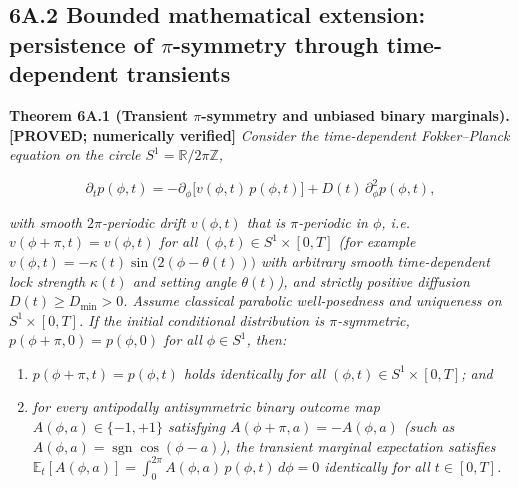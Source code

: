 \documentclass[
  american,
  11pt,
  letterpaper,
]{article}
\providecommand{\tightlist}{%
  \setlength{\itemsep}{0pt}\setlength{\parskip}{0pt}}
\begin{document}
\subsection{\texorpdfstring{6A.2 Bounded mathematical extension: persistence of \(\pi\)-symmetry through time-dependent transients}{6A.2 Bounded mathematical extension: persistence of \textbackslash pi-symmetry through time-dependent transients}}\label{a.2-bounded-mathematical-extension-persistence-of-pi-symmetry-through-time-dependent-transients}

\textbf{Theorem 6A.1 (Transient \(\pi\)-symmetry and unbiased binary marginals). {[}PROVED; numerically verified{]}} \emph{Consider the time-dependent Fokker--Planck equation on the circle \(S^1 = \mathbb{R}/2\pi\mathbb{Z}\),}

\begin{equation}
\partial_t p(\phi, t) = -\partial_\phi\bigl[v(\phi, t)\,p(\phi, t)\bigr] + D(t)\,\partial_\phi^2 p(\phi, t),
\end{equation}

\emph{with smooth \(2\pi\)-periodic drift \(v(\phi, t)\) that is \(\pi\)-periodic in \(\phi\), i.e.~\(v(\phi + \pi, t) = v(\phi, t)\) for all \((\phi, t) \in S^1 \times [0, T]\) (for example \(v(\phi, t) = -\kappa(t)\sin\bigl(2(\phi - \theta(t))\bigr)\) with arbitrary smooth time-dependent lock strength \(\kappa(t)\) and setting angle \(\theta(t)\)), and strictly positive diffusion \(D(t) \ge D_{\min} > 0\). Assume classical parabolic well-posedness and uniqueness on \(S^1 \times [0, T]\). If the initial conditional distribution is \(\pi\)-symmetric, \(p(\phi + \pi, 0) = p(\phi, 0)\) for all \(\phi \in S^1\), then:}

\begin{enumerate}
\def\labelenumi{\arabic{enumi}.}
\tightlist
\item
  \emph{\(p(\phi + \pi, t) = p(\phi, t)\) holds identically for all \((\phi, t) \in S^1 \times [0, T]\); and}
\item
  \emph{for every antipodally antisymmetric binary outcome map \(A(\phi, a) \in \{-1, +1\}\) satisfying \(A(\phi + \pi, a) = -A(\phi, a)\) (such as \(A(\phi, a) = \operatorname{sgn}\cos(\phi - a)\)), the transient marginal expectation satisfies \(\mathbb{E}_t[A(\phi, a)] = \int_0^{2\pi} A(\phi, a)\,p(\phi, t)\,d\phi = 0\) identically for all \(t \in [0, T]\).}
\end{enumerate}
\end{document}
